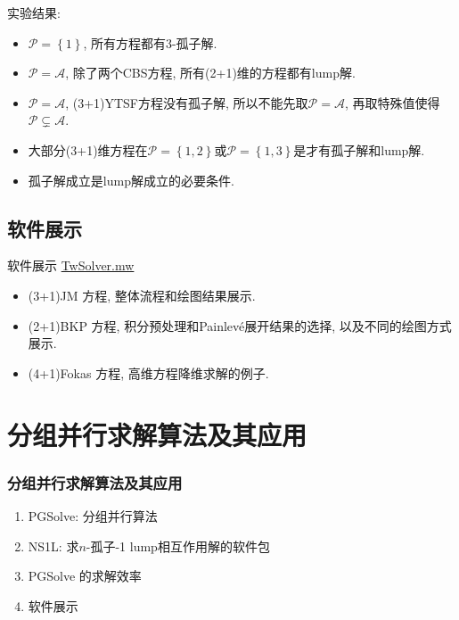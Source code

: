 \documentclass{beamer}
\newcommand{\bbrace}[1]{\left\{#1\right\}}
\newcommand{\ALLP}{\mathcal{A}}
\newcommand{\PS}{\mathcal{P}}
\newcommand{\Painleve}{Painlev{\'e}}
\begin{document}
\begin{frame}
实验结果:
\begin{itemize}
\item $\PS=\bbrace{1}$, 所有方程都有3-孤子解. 
\item $\PS=\ALLP$, 除了两个CBS方程, 所有(2+1)维的方程都有lump解. 
\item $\PS=\ALLP$, (3+1)YTSF方程没有孤子解, 所以不能先取$\PS=\ALLP$, 再取特殊值使得$\PS\subsetneq \ALLP$. 
\item 大部分(3+1)维方程在$\PS=\bbrace{1,2}$或$\PS=\bbrace{1,3}$是才有孤子解和lump解.
\item 孤子解成立是lump解成立的必要条件. 
\end{itemize}
\end{frame}

\subsection{软件展示}
\begin{frame}{软件展示}
\href{run:D:/Desktop/YjtMapleLib/build/LypReport/TwSolver.mw}{TwSolver.mw}
\begin{itemize}
\item (3+1)JM 方程, 整体流程和绘图结果展示.
\item (2+1)BKP 方程, 积分预处理和\Painleve{}展开结果的选择, 以及不同的绘图方式展示.
\item (4+1)Fokas 方程, 高维方程降维求解的例子.
\end{itemize}
\end{frame}

\section{分组并行求解算法及其应用}
\begin{frame}
\frametitle{分组并行求解算法及其应用}
\begin{enumerate}
\item PGSolve: 分组并行算法
\item NS1L: 求$n$-孤子-1 lump相互作用解的软件包
\item PGSolve 的求解效率
\item 软件展示 
\end{enumerate}
\end{frame}
\end{document}
